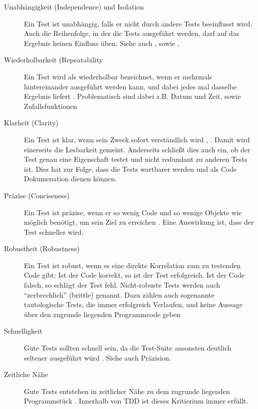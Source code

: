 \begin{description}
 \item[Unabhängigkeit (Independence) und Isolation] Ein Test ist unabhängig, falls er nicht durch andere Tests beeinflusst wird. Auch die Reihenfolge, in der die Tests ausgeführt werden, darf auf das Ergebnis keinen Einfluss üben. Siehe auch \citep{beck_test_2002}, \citep{palermo_guidelines_2006} sowie \citep[Karte 45]{langr_agile_2011}.
 \item[Wiederholbarkeit (Repeatability] Ein Test wird als wiederholbar bezeichnet, wenn er mehrmals hintereinander ausgeführt werden kann, und dabei jedes mal dasselbe Ergebnis liefert \citep[Karte 45]{langr_agile_2011} \citep{rappin_rails_2011}. Problematisch sind dabei z.B. Datum und Zeit, sowie Zufallsfunktionen
 \item[Klarheit (Clarity)] Ein Test ist klar, wenn sein Zweck sofort verständlich wird \citep{rappin_rails_2011}, \citep{palermo_guidelines_2006}. Damit wird einerseits die Lesbarkeit gemeint. Anderseits schließt dies auch ein, ob der Test genau eine Eigenschaft testet und nicht redundant zu anderen Tests ist. Dies hat zur Folge, dass die Tests wartbarer werden und als Code Dokumenation dienen können.
 \item[Präzise (Conciseness)] Ein Test ist präzise, wenn er so wenig Code und so wenige Objekte wie möglich benötigt, um sein Ziel zu erreichen \citep{palermo_guidelines_2006} \citep{rappin_rails_2011}. Eine Auswirkung ist, dass der Test schneller wird.
 \item[Robustheit (Robustness)] Ein Test ist robust, wenn es eine direkte Korrelation zum zu testenden Code gibt: Ist der Code korrekt, so ist der Test erfolgreich. Ist der Code falsch, so schlägt der Test fehl. Nicht-robuste Tests werden auch "`zerbrechlich"' (brittle) genannt. Dazu zählen auch sogenannte tautologische Tests, die immer erfolgreich Verlaufen, und keine Aussage über den zugrunde liegenden Programmcode geben
 \item[Schnelligkeit] Gute Tests sollten schnell sein, da die Test-Suite ansonsten deutlich seltener ausgeführt würd \citep{langr_agile_2011} \citep{palermo_guidelines_2006} \citep{nagappan_realizing_2008}. Siehe auch Präzision.
 \item[Zeitliche Nähe] Gute Tests entstehen in zeitlicher Nähe zu dem zugrunde liegenden Programmstück \citep{langr_agile_2011}. Innerhalb von TDD ist dieses Kritierium immer erfüllt.
 \end{description}

